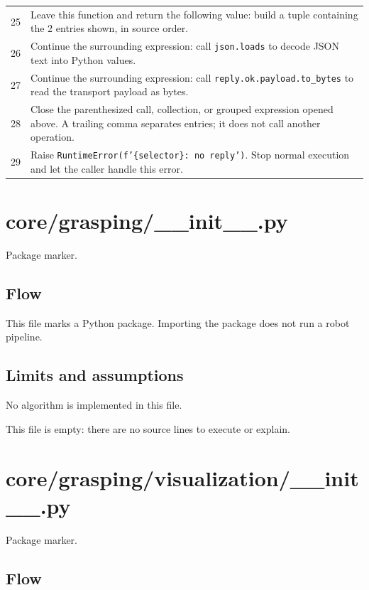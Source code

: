 \documentclass[11pt,a4paper]{book}
\begin{document}
\begin{longtable}{r p{}}
25 & Leave this function and return the following value: build a tuple containing the 2 entries shown, in source order. \\

26 & Continue the surrounding expression: call \texttt{json.loads} to decode JSON text into Python values. \\

27 & Continue the surrounding expression: call \texttt{reply.ok.payload.to\_bytes} to read the transport payload as bytes. \\

28 & Close the parenthesized call, collection, or grouped expression opened above. A trailing comma separates entries; it does not call another operation. \\

29 & Raise \texttt{RuntimeError(f'\{selector\}: no reply')}. Stop normal execution and let the caller handle this error. \\

\end{longtable}

\chapter{core/grasping/\_\_init\_\_.py}

Package marker.

\section*{Flow}

This file marks a Python package. Importing the package does not run a robot pipeline.

\section*{Limits and assumptions}

No algorithm is implemented in this file.

This file is empty: there are no source lines to execute or explain.

\chapter{core/grasping/visualization/\_\_init\_\_.py}

Package marker.

\section*{Flow}
\end{document}
